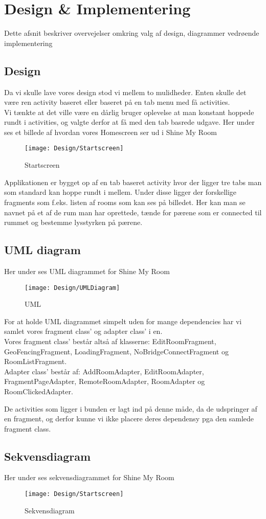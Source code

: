 \chapter{Design \& Implementering}

Dette afsnit beskriver overvejelser omkring valg af design, diagrammer vedrøende implementering

\section{Design}
Da vi skulle lave vores design stod vi mellem to mulidheder. Enten skulle det være ren activity baseret eller baseret på en tab menu med få activities. \\
Vi tænkte at det ville være en dårlig bruger oplevelse at man konstant hoppede rundt i activities, og valgte derfor at få med den tab basrede udgave.
Her under ses et billede af hvordan vores Homescreen ser ud i Shine My Room

\begin{figure}[H]
	\centering
	\texttt{[image: Design/Startscreen]}
	\caption{Startscreen}
	\label{fig:Startscreen}
\end{figure}
Applikationen er bygget op af en tab baseret activity hvor der ligger tre tabs man som standard kan hoppe rundt i mellem. Under disse ligger der forskellige fragments som f.eks. listen af rooms som kan ses på billedet. Her kan man se navnet på et af de rum man har oprettede, tænde for pærene som er connected til rummet og bestemme lysstyrken på pærene.


\section{UML diagram}
Her under ses UML diagrammet for Shine My Room
\begin{figure}[H]
	\centering
	\texttt{[image: Design/UMLDiagram]}
	\caption{UML}
	\label{fig:UML Diagram}
\end{figure}
For at holde UML diagrammet simpelt uden for mange dependencies har vi samlet vores fragment class' og adapter class' i en. \\
Vores fragment class' består altså af klasserne: EditRoomFragment, GeoFencingFragment, LoadingFragment, NoBridgeConnectFragment og RoomListFragment.\\
Adapter class' består af: AddRoomAdapter, EditRoomAdapter, FragmentPageAdapter, RemoteRoomAdapter, RoomAdapter og RoomClickedAdapter.

De activities som ligger i bunden er lagt ind på denne måde, da de udspringer af en fragment, og derfor kunne vi ikke placere deres dependensy pga den samlede fragment class.
\newpage

\section{Sekvensdiagram}
Her under ses sekvensdiagrammet for Shine My Room
\begin{figure}[H]
	\centering
	\texttt{[image: Design/Startscreen]}
	\caption{Sekvensdiagram}
	\label{fig:Sekvensdiagram}
\end{figure}